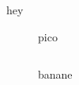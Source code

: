 


hey
\begin{figure}[ht]
    \centering
    \caption{pico}
    \label{fig:pico}
\end{figure}

$$$$ 
\begin{figure}[ht]
    \centering
    \caption{banane}
    \label{fig:banane}
\end{figure}




